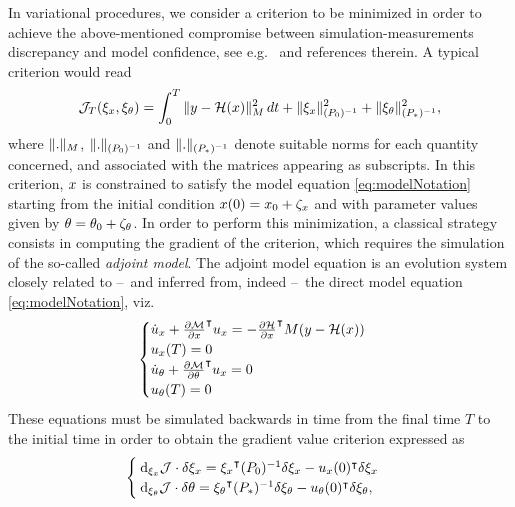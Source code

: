 In variational procedures, we consider a criterion to be minimized in order to achieve the above-mentioned compromise between simulation-measurements discrepancy and model confidence, see e.g.~\cite{Bensoussan71,Chavent10} and references therein. A typical criterion would read
\begin{equation}\label{eq:varCriterion}
	\mathcal{J}_T(\xi_x,\xi_{\theta}) = \int_0^T \|y-\mathcal{H}(x)\|_{M}^2 \, dt + \|\xi_x\|_{(P_{0})^{-1}}^2 + \|\xi_{\theta}\|_{(P_{*})^{-1}}^2,
\end{equation}
where $\|.\|_{M}$, $\|.\|_{(P_{0})^{-1}}$ and $\|.\|_{(P_{*})^{-1}}$ denote suitable norms for each quantity concerned, and associated with the matrices appearing as subscripts. In this criterion, $x$ is constrained to satisfy the model equation \eqref{eq:modelNotation} starting from the initial condition $x(0)=x_0+\zeta_x$ and with parameter values given by $\theta=\theta_0+\zeta_\theta$. In order to perform this minimization, a classical strategy consists in computing the gradient of the criterion, which requires the simulation of the so-called \emph{adjoint model}. The adjoint model equation is an evolution system closely related to --~and inferred from, indeed --~the direct model equation \eqref{eq:modelNotation}, viz.
\begin{equation}\label{eq:adjointPb}
	\begin{cases}
	\dot{u}_x + \frac{\partial \mathcal{M}}{\partial x}^\intercal u_x = -\frac{\partial \mathcal{H}}{\partial x}^\intercal M(y-\mathcal{H}(x)) \\
	u_x(T) = 0 \\
	\dot{u}_{\theta} + \frac{\partial \mathcal{M}}{\partial \theta}^\intercal u_x= 0 \\
	u_{\theta}(T) = 0
	\end{cases}
\end{equation}
These equations must be simulated backwards in time from the final time $T$ to the initial time in order to obtain the gradient value criterion expressed as
\[
	\begin{cases}
		\: \mathrm{d}_{\xi_x}\mathcal{J} \cdot \delta \xi_x = {\xi_x}^\intercal (P_{0})^{-1} \delta \xi_x - u_x(0)^\intercal \delta \xi_x\\
		\: \mathrm{d}_{\xi_{\theta}}\mathcal{J} \cdot \delta \theta = {\xi_\theta}^\intercal (P_{*})^{-1} \delta \xi_\theta - u_{\theta}(0)^\intercal \delta \xi_\theta,
	\end{cases}
\]
